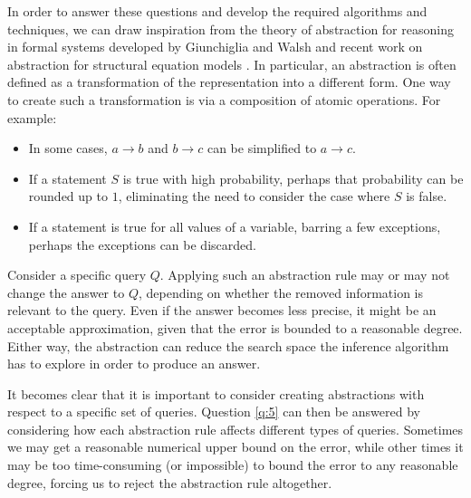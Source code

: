 \documentclass{article}
\begin{document}
In order to answer these questions and develop the required algorithms and
techniques, we can draw inspiration from the theory of abstraction for reasoning
in formal systems developed by Giunchiglia and Walsh
\cite{DBLP:journals/ai/GiunchigliaW92} and recent work on abstraction for
structural equation models \cite{DBLP:conf/uai/RubensteinWBMJG17}. In
particular, an abstraction is often defined as a transformation of the
representation into a different form. One way to create such a transformation is
via a composition of atomic operations. For example:
\begin{itemize}
\item In some cases, $a \rightarrow b$ and $b \rightarrow c$ can be simplified
  to $a \rightarrow c$.
\item If a statement $S$ is true with high probability, perhaps that probability
  can be rounded up to $1$, eliminating the need to consider the case where $S$
  is false.
\item If a statement is true for all values of a variable, barring a few
  exceptions, perhaps the exceptions can be discarded.
\end{itemize}

Consider a specific query $Q$. Applying such an abstraction rule may or may not
change the answer to $Q$, depending on whether the removed information
is relevant to the query. Even if the answer becomes less precise, it might be
an acceptable approximation, given that the error is bounded to a reasonable
degree. Either way, the abstraction can reduce the search space the inference
algorithm has to explore in order to produce an answer.

It becomes clear that it is important to consider creating abstractions with
respect to a specific set of queries. Question \ref{q:5} can then be answered by
considering how each abstraction rule affects different types of queries.
Sometimes we may get a reasonable numerical upper bound on the error, while
other times it may be too time-consuming (or impossible) to bound the error to
any reasonable degree, forcing us to reject the abstraction rule altogether.
\end{document}
